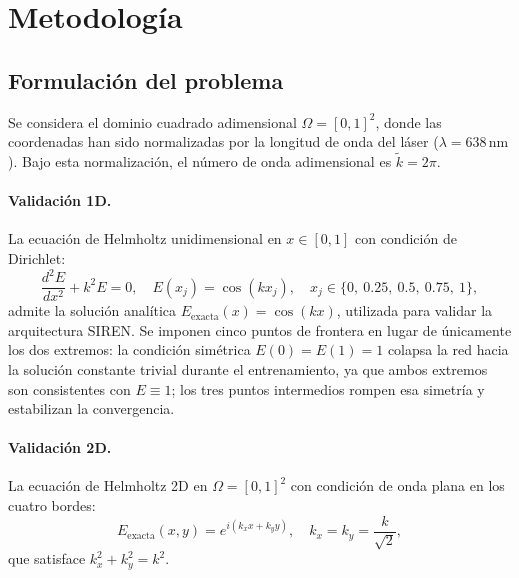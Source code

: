 
\section{Metodología}
\label{sec:metodologia}

\subsection{Formulación del problema}
\label{subsec:formulacion}

Se considera el dominio cuadrado adimensional $\Omega = [0,1]^2$, donde las coordenadas
han sido normalizadas por la longitud de onda del láser ($\lambda = 638\,\mathrm{nm}$).
Bajo esta normalización, el número de onda adimensional es $\tilde{k} = 2\pi$.

\paragraph{Validación 1D.}
La ecuación de Helmholtz unidimensional en $x \in [0,1]$ con condición de Dirichlet:
%
\begin{equation}
  \frac{d^2 E}{dx^2} + k^2 E = 0, \quad
  E(x_j) = \cos(k x_j), \quad x_j \in \{0,\ 0.25,\ 0.5,\ 0.75,\ 1\},
  \label{eq:helmholtz1d}
\end{equation}
%
admite la solución analítica $E_{\mathrm{exacta}}(x) = \cos(kx)$, utilizada para
validar la arquitectura SIREN. Se imponen cinco puntos de frontera en lugar de
únicamente los dos extremos: la condición simétrica $E(0) = E(1) = 1$ colapsa
la red hacia la solución constante trivial durante el entrenamiento, ya que
ambos extremos son consistentes con $E \equiv 1$; los tres puntos intermedios
rompen esa simetría y estabilizan la convergencia.

\paragraph{Validación 2D.}
La ecuación de Helmholtz 2D en $\Omega = [0,1]^2$ con condición de onda plana en los
cuatro bordes:
%
\begin{equation}
  E_{\mathrm{exacta}}(x,y) = e^{i(k_x x + k_y y)}, \quad k_x = k_y = \frac{k}{\sqrt{2}},
  \label{eq:solucion2d}
\end{equation}
%
que satisface $k_x^2 + k_y^2 = k^2$.

